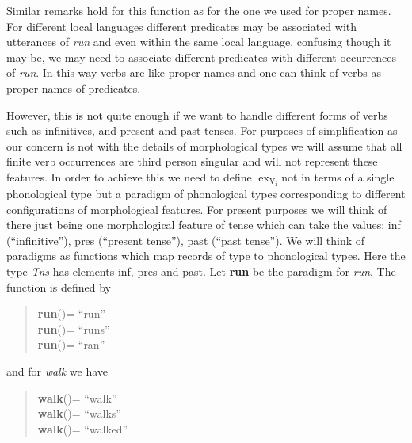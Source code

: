 Similar remarks hold for this function as for the one we used for
proper names.  For different local languages different predicates may
be associated with utterances of \textit{run} and even within the same
local language, confusing though it may be, we may need to associate
different predicates with different occurrences of \textit{run}.  In
this way verbs are like proper names and one can think of verbs as
proper names of predicates.

However, this is not quite enough if we want to handle different forms
of verbs such as infinitives, and present and past tenses.  For purposes
of simplification as our concern is not with the details of
morphological types we will assume that all finite verb occurrences are third person
singular and will not represent these features.  In order to
achieve this we need to define lex$_{\mathrm{V_{\mathrm{i}}}}$ not in
terms of a single phonological type but a paradigm of phonological
types corresponding to different configurations of morphological
features.  For present purposes we will think of there just being one
morphological feature of tense which can take the values: inf
(``infinitive''), pres (``present tense''), past (``past tense'').  We
will think of paradigms as functions which map records of type
 to phonological types.
  Here the type \textit{Tns} has elements inf, pres and past.  Let
  \textbf{\textsf{run}} be the paradigm for \textit{run}. The function
  is defined by
\begin{quote}
\textbf{\textsf{run}}()= ``run'' \\
\textbf{\textsf{run}}()= ``runs'' \\
\textbf{\textsf{run}}()= ``ran''
\end{quote}
and for \textit{walk} we have
\begin{quote}
\textbf{\textsf{walk}}()= ``walk'' \\
\textbf{\textsf{walk}}()= ``walks'' \\
\textbf{\textsf{walk}}()= ``walked''
\end{quote}

